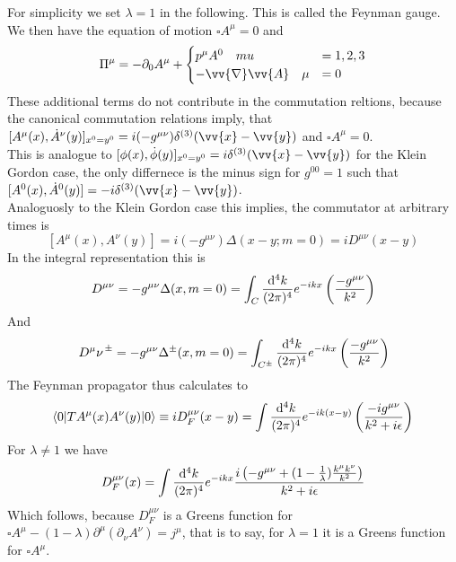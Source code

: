 \documentclass{include/thesisclass}
\newcommand{\rk}{\rangle}
\newcommand{\lk}{\langle}
\newcommand{\vx}{\vv{x}}
\newcommand{\vy}{\vv{y}}
\newcommand{\dd}{{\rm d}}
\newcommand{\p}{\partial}
\newcommand{\eps}{\epsilon}
\newcommand{\vn}{\vv{\nabla}}
\begin{document}
For simplicity we set $\lambda = 1$ in the following. This is called the Feynman gauge.
We then have the equation of motion $\square A^\mu = 0$ and
\[ \Pi^\mu = - \p_0 A^\mu + \begin{cases} p^\mu A^0 ~~~mu &= 1,2,3\\
-\vn \vv{A} ~~~\mu &= 0\end{cases}\]
These additional terms do not contribute in the commutation reltions, because the canonical commutation relations imply, that $[A^\mu(x), \dot A^\nu(y)]_{x^0 = y^0} = i ( - g^{\mu\nu}) \delta^{(3)}(\vx - \vy)$ and $\square A^\mu = 0$.\\
This is analogue to $[\phi(x), \dot \phi(y)]_{x^0 = y^0} = i \delta^{(3)}(\vx - \vy)$  for the Klein Gordon case, the only differnece is the minus sign for $g^{00} = 1$ such that $[A^0(x), \dot A^0(y)] = - i \delta^{(3)}(\vx - \vy)$.\\
Analoguosly to the Klein Gordon case this implies, the commutator at arbitrary times is
\[ [A^\mu (x) , A^\nu(y)] = i (-g^{\mu\nu})\Delta(x-y; m = 0) = i D^{\mu\nu}(x-y)\]
In the integral representation this is
\[ D^{\mu\nu} = - g^{\mu\nu} \Delta(x, m = 0) = \int _C \frac{ \dd ^ 4k}{(2\pi)^4} e^{-ikx} \left( \frac{-g^{\mu\nu}}{k^2}\right)\]
And
\[ \left.D^\mu\nu\right.^\pm = - g^{\mu\nu} \Delta^\pm (x, m =0) = \int_{C^\pm} \frac{\dd ^4k}{(2\pi)^4} e^{-ikx} \left( \frac{-g^{\mu\nu}}{k^2}\right)\]
The Feynman propagator thus calculates to
\[ \lk 0 | T A^\mu(x) A^\nu(y) | 0 \rk \equiv i D_F^{\mu\nu}(x-y) = \int \frac{\dd ^4 k}{(2\pi)^4} e^{-ik(x-y)} \left( \frac{ -ig^{\mu\nu}}{k^2 + i \eps}\right)\]
For $\lambda \neq 1 $ we have 
\[ D^{\mu\nu}_F(x) = \int \frac{\dd ^4 k}{(2\pi)^4} e^{-ikx} \frac{ i \left( - g^{\mu\nu} + ( 1 - \frac{1}{\lambda}) \frac{k^\mu k^\nu}{k^2}\right)}{k^2 + i \eps}\]
Which follows, because $D^{\mu\nu}_F$ is a Greens function for $\square A^\mu - ( 1-\lambda)\p^\mu ( \p_\nu A^\nu) = j^\mu$, that is to say, for $\lambda = 1$ it is a Greens function for $\square A^\mu$.
\end{document}
